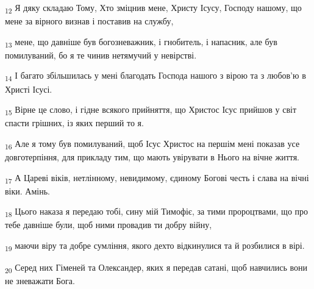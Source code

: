 \begin{tcolorbox}
\textsubscript{12} Я дяку складаю Тому, Хто зміцнив мене, Христу Ісусу, Господу нашому, що мене за вірного визнав і поставив на службу,
\end{tcolorbox}
\begin{tcolorbox}
\textsubscript{13} мене, що давніше був богозневажник, і гнобитель, і напасник, але був помилуваний, бо я те чинив нетямучий у невірстві.
\end{tcolorbox}
\begin{tcolorbox}
\textsubscript{14} І багато збільшилась у мені благодать Господа нашого з вірою та з любов'ю в Христі Ісусі.
\end{tcolorbox}
\begin{tcolorbox}
\textsubscript{15} Вірне це слово, і гідне всякого прийняття, що Христос Ісус прийшов у світ спасти грішних, із яких перший то я.
\end{tcolorbox}
\begin{tcolorbox}
\textsubscript{16} Але я тому був помилуваний, щоб Ісус Христос на першім мені показав усе довготерпіння, для прикладу тим, що мають увірувати в Нього на вічне життя.
\end{tcolorbox}
\begin{tcolorbox}
\textsubscript{17} А Цареві віків, нетлінному, невидимому, єдиному Богові честь і слава на вічні віки. Амінь.
\end{tcolorbox}
\begin{tcolorbox}
\textsubscript{18} Цього наказа я передаю тобі, сину мій Тимофіє, за тими пророцтвами, що про тебе давніше були, щоб ними провадив ти добру війну,
\end{tcolorbox}
\begin{tcolorbox}
\textsubscript{19} маючи віру та добре сумління, якого дехто відкинулися та й розбилися в вірі.
\end{tcolorbox}
\begin{tcolorbox}
\textsubscript{20} Серед них Гіменей та Олександер, яких я передав сатані, щоб навчились вони не зневажати Бога.
\end{tcolorbox}
